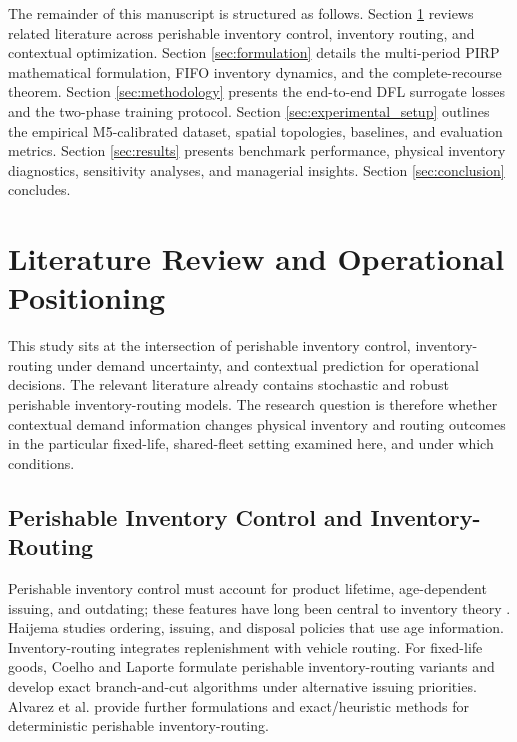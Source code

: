 \documentclass[11pt,a4paper]{article}
\theoremstyle{definition}
\theoremstyle{remark}
\begin{document}
The remainder of this manuscript is structured as follows. Section \ref{sec:literature} reviews related literature across perishable inventory control, inventory routing, and contextual optimization. Section \ref{sec:formulation} details the multi-period PIRP mathematical formulation, FIFO inventory dynamics, and the complete-recourse theorem. Section \ref{sec:methodology} presents the end-to-end DFL surrogate losses and the two-phase training protocol. Section \ref{sec:experimental_setup} outlines the empirical M5-calibrated dataset, spatial topologies, baselines, and evaluation metrics. Section \ref{sec:results} presents benchmark performance, physical inventory diagnostics, sensitivity analyses, and managerial insights. Section \ref{sec:conclusion} concludes.

\section{Literature Review and Operational Positioning}
\label{sec:literature}

This study sits at the intersection of perishable inventory control, inventory-routing under demand uncertainty, and contextual prediction for operational decisions. The relevant literature already contains stochastic and robust perishable inventory-routing models. The research question is therefore whether contextual demand information changes physical inventory and routing outcomes in the particular fixed-life, shared-fleet setting examined here, and under which conditions.

\subsection{Perishable Inventory Control and Inventory-Routing}
\label{subsec:lit_pirp}

Perishable inventory control must account for product lifetime, age-dependent issuing, and outdating; these features have long been central to inventory theory \citep{nahmias1982perishable}. Haijema \citeyearpar{haijema2014new} studies ordering, issuing, and disposal policies that use age information. Inventory-routing integrates replenishment with vehicle routing. For fixed-life goods, Coelho and Laporte \citeyearpar{coelho2014optimal} formulate perishable inventory-routing variants and develop exact branch-and-cut algorithms under alternative issuing priorities. Alvarez et al. \citeyearpar{alvarez2020formulations} provide further formulations and exact/heuristic methods for deterministic perishable inventory-routing.
\end{document}
